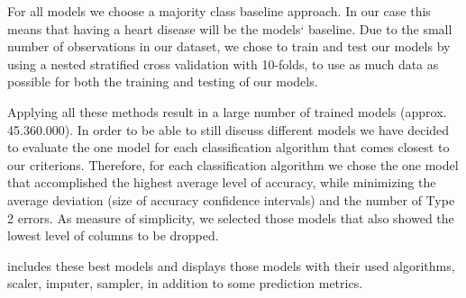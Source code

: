 For all models we choose a majority class baseline approach. In our case this means that having a heart disease will be the models` baseline. Due to the small number of observations in our dataset, we chose to train and test our models by using a nested stratified cross validation with 10-folds, to use as much data as possible for both the training and testing of our models. 

Applying all these methods result in a large number of trained models (approx. 45.360.000). In order to be able to still discuss different models we have decided to evaluate the one model for each classification algorithm that comes closest to our criterions. Therefore, for each classification algorithm we chose the one model that accomplished the highest average level of accuracy, while minimizing the average deviation (size of accuracy confidence intervals) and the number of Type 2 errors. As measure of simplicity, we selected those models that also showed the lowest level of columns to be dropped. 

 includes these best models and displays those models with their used algorithms, scaler, imputer, sampler, in addition to some prediction metrics.  



